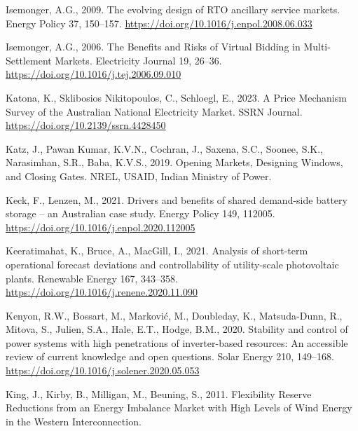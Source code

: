 \documentclass[12pt,a4paper,]{report}
\newlength{\cslhangindent}
\newenvironment{CSLReferences}[2] %
 {%
  \setlength{\parindent}{0pt}
  \ifodd #1 \everypar{\setlength{\hangindent}{\cslhangindent}}\ignorespaces\fi
  \ifnum #2 > 0
  \setlength{\parskip}{#2\baselineskip}
  \fi
 }%
 {}
\begin{document}
\begin{CSLReferences}{1}{0}
\leavevmode{}%
Isemonger, A.G., 2009. The evolving design of {RTO} ancillary service
markets. Energy Policy 37, 150--157.
\url{https://doi.org/10.1016/j.enpol.2008.06.033}

\leavevmode{}%
Isemonger, A.G., 2006. The {Benefits} and {Risks} of {Virtual Bidding}
in {Multi-Settlement Markets}. Electricity Journal 19, 26--36.
\url{https://doi.org/10.1016/j.tej.2006.09.010}

\leavevmode{}%
Katona, K., Sklibosios Nikitopoulos, C., Schloegl, E., 2023. A {Price
Mechanism Survey} of the {Australian National Electricity Market}. SSRN
Journal. \url{https://doi.org/10.2139/ssrn.4428450}

\leavevmode{}%
Katz, J., Pawan Kumar, K.V.N., Cochran, J., Saxena, S.C., Soonee, S.K.,
Narasimhan, S.R., Baba, K.V.S., 2019. Opening {Markets}, {Designing
Windows}, and {Closing Gates}. {NREL, USAID, Indian Ministry of Power}.

\leavevmode{}%
Keck, F., Lenzen, M., 2021. Drivers and benefits of shared demand-side
battery storage -- an {Australian} case study. Energy Policy 149,
112005. \url{https://doi.org/10.1016/j.enpol.2020.112005}

\leavevmode{}%
Keeratimahat, K., Bruce, A., MacGill, I., 2021. Analysis of short-term
operational forecast deviations and controllability of utility-scale
photovoltaic plants. Renewable Energy 167, 343--358.
\url{https://doi.org/10.1016/j.renene.2020.11.090}

\leavevmode{}%
Kenyon, R.W., Bossart, M., Marković, M., Doubleday, K., Matsuda-Dunn,
R., Mitova, S., Julien, S.A., Hale, E.T., Hodge, B.M., 2020. Stability
and control of power systems with high penetrations of inverter-based
resources: {An} accessible review of current knowledge and open
questions. Solar Energy 210, 149--168.
\url{https://doi.org/10.1016/j.solener.2020.05.053}

\leavevmode{}%
King, J., Kirby, B., Milligan, M., Beuning, S., 2011. Flexibility
{Reserve Reductions} from an {Energy Imbalance Market} with {High
Levels} of {Wind Energy} in the {Western Interconnection}.


\end{CSLReferences}
\end{document}
